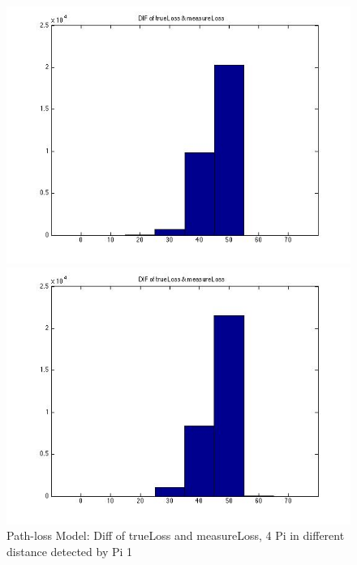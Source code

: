 \documentclass[10pt,conference]{IEEEtran}
\begin{document}
\begin{figure}[htbp]
\begin{minipage}[t]{0.2\textwidth}
	\includegraphics[scale=0.2]{pathloss0-3}
\end{minipage}
\begin{minipage}[t]{0.2\textwidth}
	\centering
	\includegraphics[scale=0.2]{pathloss0-4}
\end{minipage}
\caption{Path-loss Model: Diff of trueLoss and measureLoss, 4 Pi in different distance detected by Pi 1}\label{pathloss}
\end{figure}
\end{document}
